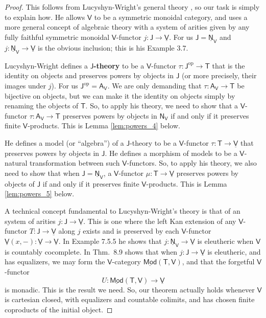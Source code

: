 \documentclass{amsart}
\newcommand{\define}[1]{{\bf \boldmath{#1}}}
\theoremstyle{definition}
\newcommand{\Mod}{\mathsf{Mod}}
\newcommand{\NN}{\mathsf{N}}
\newcommand{\A}{\mathsf{A}}
\newcommand{\V}{\mathsf{V}}
\newcommand{\J}{\mathsf{J}}
\newcommand{\T}{\mathsf{T}}
\newcommand{\op}{\mathrm{op}}
\newcommand{\maps}{\colon}
\begin{document}
\begin{proof}
This follows from Lucyshyn-Wright's general theory \cite{lucyshyn-wright}, so our task is simply to explain how.   He allows $\V$ to be a symmetric monoidal category, and uses a more general concept of algebraic theory with a system of arities given by any fully faithful symmetric monoidal $\V$-functor $j \maps \J \to \underline{\V}$.   For us $\J = \underline{\NN}_\V$ and $j \maps \underline{\NN}_\V \to \underline{\V}$ is the obvious inclusion; this is his Example 3.7.

Lucyshyn-Wright defines a \textbf{$\J$-theory} to be a $\V$-functor $\tau \maps \J^\op \to \T$ that is the identity on objects and preserves powers by objects in $\J$ (or more precisely, their images under $j$).  For us $\J^\op = \A_\V$.   We are only demanding that $\tau \maps \A_\V \to \T$ be bijective on objects, but we can make it the identity on objects simply by renaming the objects of $\T$.  So, to apply his theory, we need to show that a $\V$-functor $\tau \maps \A_\V \to \T$ preserves powers by objects in $\NN_\V$ if and only if it preserves finite $\V$-products.  This is Lemma \ref{lem:powers_4} below.

He defines a model (or ``algebra'') of a $\J$-theory to be a $\V$-functor $\tau \maps \T \to \underline{\V}$ that preserves powers by objects in $\J$.   He defines a morphism of models to be a $\V$-natural transformation between such $\V$-functors.  So, to apply his theory, we also need to show that when $\J = \underline{\NN}_\V$, a $\V$-functor $\mu \maps \T \to \underline{\V}$ preserves powers by objects of $\J$ if and only if it preserves finite $\V$-products.   This is Lemma \ref{lem:powers_5} below.

A technical concept fundamental to Lucyshyn-Wright's theory is that of an \define{eleutheric} system of arities $j \maps \J \to \underline{\V}$.  This is one where the left Kan extension of any $\V$-functor $T \maps \J \to \underline{\V}$ along $j$ exists and is preserved by each $\V$-functor
$\underline{\V}(x,-) \maps \underline{\V} \to \underline{\V}$.  In Example 7.5.5 he shows
that $j \maps \underline{\NN}_\V \to \underline{\V}$ is eleutheric when $\V$ is 
countably cocomplete.  In Thm.\ 8.9 shows that when $j \maps \J \to \underline{\V}$ is eleutheric, and has equalizers, we may form the $\V$-category $\underline{\Mod}(\T,\V)$, and that the forgetful $\V$-functor
\[   U \maps \underline{\Mod}(\T,\V) \to \underline{\V} \]
is monadic.  This is the result we need.   So, our theorem actually holds whenever $\V$ is cartesian closed, with equalizers and countable colimits, and has chosen finite coproducts of the initial object.  \end{proof}
\end{document}
